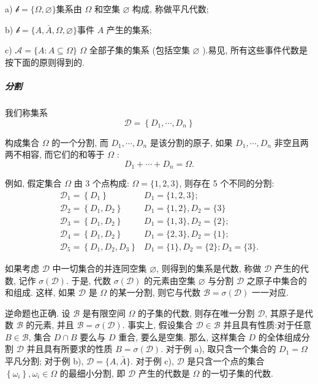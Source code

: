 \begin{example}
    a) $\mathscr{b}=\{\Omega, \varnothing\}$集系由 $\Omega$ 和空集 $\varnothing$ 构成, 称做平凡代数;

b) $\mathscr{b}=\{A, \bar{A}, \Omega, \varnothing\}$事件 $A$ 产生的集系;

c) $\mathscr{A}=\{A: A \subseteq \Omega\}$ $\Omega$ 全部子集的集系 (包括空集 $\varnothing$ ).易见, 所有这些事件代数是按下面的原则得到的.
\end{example}

\subparagraph{分割 }我们称集系
$$
\mathscr{D}=\left\{D_1, \cdots, D_n\right\}
$$

构成集合 $\Omega$ 的一个分割, 而 $D_1, \cdots, D_n$ 是该分割的原子, 如果 $D_1, \cdots, D_n$ 非空且两两不相容, 而它们的和等于 $\Omega$ :
$$
D_1+\cdots+D_n=\Omega .
$$

\begin{example}
    例如, 假定集合 $\Omega$ 由 3 个点构成: $\Omega=\{1,2,3\}$, 则存在 5 个不同的分割:
$$
\begin{array}{ll}
\mathscr{D}_1=\left\{D_1\right\} & D_1=\{1,2,3\} ; \\
\mathscr{D}_2=\left\{D_1, D_2\right\} & D_1=\{1,2\}, D_2=\{3\} \\
\mathscr{D}_3=\left\{D_1, D_2\right\} & D_1=\{1,3\}, D_2=\{2\} ; \\
\mathscr{D}_4=\left\{D_1, D_2\right\} & D_1=\{2,3\}, D_2=\{1\} ; \\
\mathscr{D}_5=\left\{D_1, D_2, D_3\right\} & D_1=\{1\}, D_2=\{2\} ; D_3=\{3\} .
\end{array}
$$
\end{example}

如果考虑 $\mathscr{D}$ 中一切集合的并连同空集 $\varnothing$, 则得到的集系是代数, 称做 $\mathscr{D}$ 产生的代数, 记作 $\sigma(\mathscr{D})$. 于是, 代数 $\sigma(\mathscr{D})$ 的元素由空集 $\varnothing$ 与分割 $\mathscr{D}$ 之原子中集合的和组成.
这样, 如果 $\mathscr{D}$ 是 $\Omega$ 的某一分割, 则它与代数 $\mathscr{B}=\sigma(\mathscr{D})$ 一一对应.

逆命题也正确. 设 $\mathscr{B}$ 是有限空间 $\Omega$ 的子集的代数, 则存在唯一分割 $\mathscr{D}$, 其原子是代数 $\mathscr{B}$ 的元素, 并且 $\mathscr{B}=\sigma(\mathscr{D})$. 事实上, 假设集合 $\mathscr{D} \in \mathscr{B}$ 并且具有性质:对于任意 $B \in \mathscr{B}$, 集合 $D \cap B$ 要么与 $D$ 重合, 要么是空集. 那么, 这样集合 $D$ 的全体组成分割 $\mathscr{D}$ 并且具有所要求的性质 $B=\sigma(\mathscr{D})$. 对于例 a), 取只含一个集合的 $D_1=\Omega$ 平凡分割; 对于例 b), $\mathscr{D}=\{A, \bar{A}\}$. 对于例 c), $\mathscr{D}$ 是只含一个点的集合 $\left\{\omega_i\right\}, \omega_i \in \Omega$ 的最细小分割, 即 $\mathscr{D}$ 产生的代数是 $\Omega$ 的一切子集的代数.

